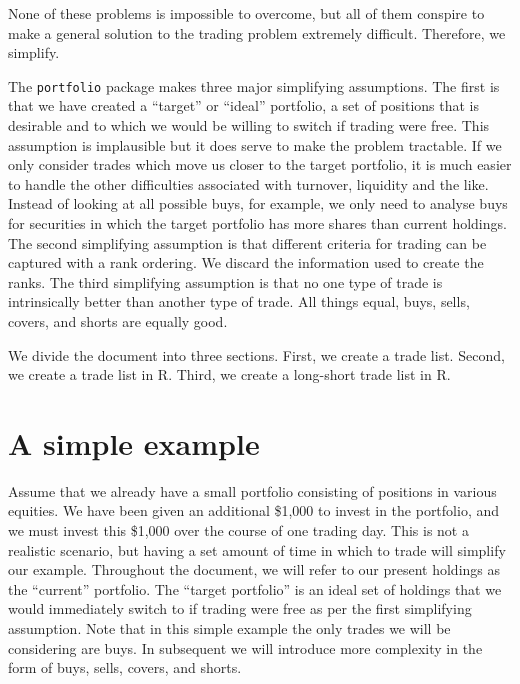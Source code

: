\documentclass{article}
\begin{document}
None of these problems is impossible to overcome, but all of them
conspire to make a general solution to the trading problem extremely
difficult. Therefore, we simplify.

\label{simplifying assumption}

The \texttt{portfolio} package makes three major simplifying
assumptions.  The first is that we have created a ``target'' or
``ideal'' portfolio, a set of positions that is desirable and to which
we would be willing to switch if trading were free. This assumption is
implausible but it does serve to make the problem tractable. If we
only consider trades which move us closer to the target portfolio, it
is much easier to handle the other difficulties associated with
turnover, liquidity and the like. Instead of looking at all possible
buys, for example, we only need to analyse buys for securities in
which the target portfolio has more shares than current holdings.  The
second simplifying assumption is that different criteria for trading
can be captured with a rank ordering.  We discard the information used
to create the ranks.  The third simplifying assumption is that no one
type of trade is intrinsically better than another type of trade.  All
things equal, buys, sells, covers, and shorts are equally good.

We divide the document into three sections.  First, we create a trade
list.  Second, we create a trade list in R.  Third, we create a
long-short trade list in R.

\section{A simple example}



Assume that we already have a small portfolio consisting of positions
in various equities.  We have been given an additional \$1,000 to
invest in the portfolio, and we must invest this \$1,000 over the
course of one trading day.  This is not a realistic scenario, but
having a set amount of time in which to trade will simplify our
example.  Throughout the document, we will refer to our present
holdings as the ``current'' portfolio.  The ``target portfolio'' is an
ideal set of holdings that we would immediately switch to if trading
were free as per the first simplifying assumption.  Note that in this
simple example the only trades we will be considering are buys.  In
subsequent we will introduce more complexity in the form of buys,
sells, covers, and shorts.
\end{document}
